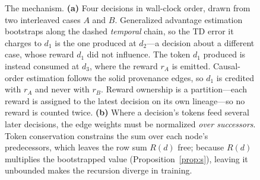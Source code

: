 \begin{figure}[t]
\caption{The mechanism. \textbf{(a)} Four decisions in wall-clock order, drawn
from two interleaved cases $A$ and $B$. Generalized advantage estimation
bootstraps along the dashed \emph{temporal} chain, so the TD error it charges to
$d_1$ is the one produced at $d_2$---a decision about a different case, whose
reward $d_1$ did not influence. The token $d_1$ produced is instead consumed at
$d_3$, where the reward $r_A$ is emitted. Causal-order estimation follows the
solid provenance edges, so $d_1$ is credited with $r_A$ and never with $r_B$.
Reward ownership is a partition---each reward is assigned to the latest decision
on its own lineage---so no reward is counted twice. \textbf{(b)} Where a
decision's tokens feed several later decisions, the edge weights must be
normalized \emph{over successors}. Token conservation constrains the sum over
each node's predecessors, which leaves the row sum $R(d)$ free; because $R(d)$
multiplies the bootstrapped value (Proposition~\ref{prop:s}), leaving it
unbounded makes the recursion diverge in training.}
\label{fig:lineage}
\end{figure}
